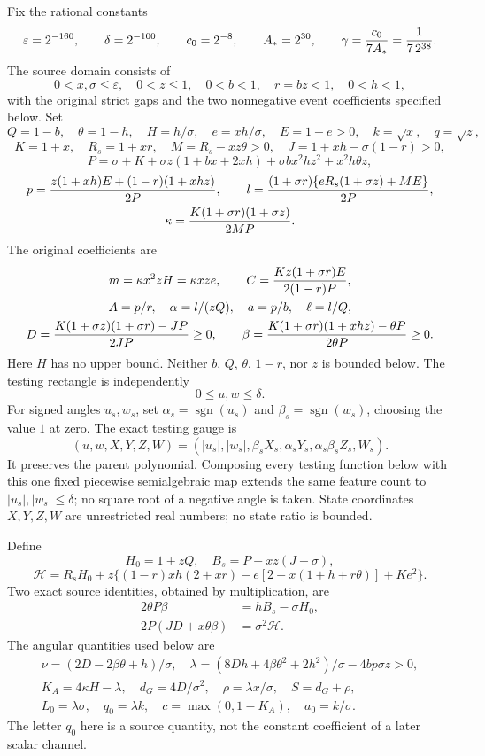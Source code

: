\documentclass[11pt]{article}
\newcommand{\eps}{\varepsilon}
\begin{document}
Fix the rational constants
\[
 \eps=2^{-160},\qquad \delta=2^{-100},\qquad
 c_0=2^{-8},\qquad A_*=2^{30},\qquad
 \gamma={c_0\over7A_*}={1\over7\,2^{38}}.
\]
The source domain consists of
\[
 0<x,\sigma\le\eps,\quad 0<z\le1,\quad 0<b<1,
 \quad r=bz<1,\quad 0<h<1,
\]
with the original strict gaps and the two nonnegative event
coefficients specified below. Set
\[
 Q=1-b,\quad \theta=1-h,\quad H=h/\sigma,\quad e=xh/\sigma,
 \quad E=1-e>0,\quad k=\sqrt x,\quad q=\sqrt z,
\]
\[
 K=1+x,\quad R_s=1+xr,\quad M=R_s-xz\theta>0,
 \quad J=1+xh-\sigma(1-r)>0,
\]
\[
 P=\sigma+K+\sigma z(1+bx+2xh)
                  +\sigma bx^2hz^2+x^2h\theta z,
\]
\[
\begin{gathered}
 p={z(1+xh)E+(1-r)(1+xhz)\over2P},\qquad
 l={(1+\sigma r)\{eR_s(1+\sigma z)+ME\}\over2P},\\
 \kappa={K(1+\sigma r)(1+\sigma z)\over2MP}.
\end{gathered}
\]
The original coefficients are
\[
\begin{gathered}
 m=\kappa x^2zH=\kappa xze,\qquad
 C={Kz(1+\sigma r)E\over2(1-r)P},\\
 A=p/r,\quad \alpha=l/(zQ),\quad a=p/b,\quad \ell=l/Q,\\
 D={K(1+\sigma z)(1+\sigma r)-JP\over2JP}\ge0,\qquad
 \beta={K(1+\sigma r)(1+xhz)-\theta P\over2\theta P}\ge0.
\end{gathered}
\]
Here $H$ has no upper bound. Neither $b$, $Q$, $\theta$, $1-r$,
nor $z$ is bounded below. The testing rectangle is independently
\[
                  0\le u,w\le\delta.
\]
For signed angles $u_s,w_s$, set
$\alpha_s=\operatorname{sgn}(u_s)$ and
$\beta_s=\operatorname{sgn}(w_s)$, choosing the value $1$ at zero.
The exact testing gauge is
\[
 (u,w,X,Y,Z,W)=(|u_s|,|w_s|,\beta_sX_s,\alpha_sY_s,
                                \alpha_s\beta_sZ_s,W_s).
\]
It preserves the parent polynomial. Composing every testing function
below with this one fixed piecewise semialgebraic map extends the
same feature count to $|u_s|,|w_s|\le\delta$; no square root of a
negative angle is taken. State coordinates $X,Y,Z,W$ are unrestricted
real numbers; no state ratio is bounded.

Define
\[
 H_0=1+zQ,\quad B_s=P+xz(J-\sigma),
\]
\[
 \mathcal H=R_sH_0+z\{(1-r)xh(2+xr)
 -e[2+x(1+h+r\theta)]+Ke^2\}.
\]
Two exact source identities, obtained by multiplication, are
\begin{align}
 2\theta P\beta&=hB_s-\sigma H_0,\label{eq:BE3}\\
 2P(JD+x\theta\beta)&=\sigma^2\mathcal H.\label{eq:BE4}
\end{align}
The angular quantities used below are
\[
\begin{gathered}
 \nu=(2D-2\beta\theta+h)/\sigma,\quad
 \lambda=(8Dh+4\beta\theta^2+2h^2)/\sigma-4bp\sigma z>0,\\
 K_A=4\kappa H-\lambda,\quad d_G=4D/\sigma^2,
 \quad \rho=\lambda x/\sigma,\quad S=d_G+\rho,\\
 L_0=\lambda\sigma,\quad q_0=\lambda k,\quad
 c=\max(0,1-K_A),\quad a_0=k/\sigma.
\end{gathered}
\]
The letter $q_0$ here is a source quantity, not the constant
coefficient of a later scalar channel.
\end{document}
